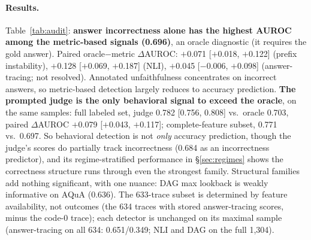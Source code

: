 \documentclass{article}
\begin{document}
\paragraph{Results.} Table~\ref{tab:audit}: \textbf{answer incorrectness alone has the highest AUROC among the metric-based signals (0.696)}, an oracle diagnostic (it requires the gold answer). Paired oracle$-$metric $\Delta$AUROC: $+$0.071 [$+$0.018, $+$0.122] (prefix instability), $+$0.128 [$+$0.069, $+$0.187] (NLI), $+$0.045 [$-$0.006, $+$0.098] (answer-tracing; not resolved). Annotated unfaithfulness concentrates on incorrect answers, so metric-based detection largely reduces to accuracy prediction. \textbf{The prompted judge is the only behavioral signal to exceed the oracle}, on the same samples: full labeled set, judge 0.782 [0.756, 0.808] vs.\ oracle 0.703, paired $\Delta$AUROC $+$0.079 [$+$0.043, $+$0.117]; complete-feature subset, 0.771 vs.\ 0.697. So behavioral detection is not \emph{only} accuracy prediction, though the judge's scores do partially track incorrectness (0.684 as an incorrectness predictor), and its regime-stratified performance in \S\ref{sec:regimes} shows the correctness structure runs through even the strongest family. Structural families add nothing significant, with one nuance: DAG max lookback is weakly informative on AQuA (0.636). The 633-trace subset is determined by feature availability, not outcomes (the 634 traces with stored answer-tracing scores, minus the code-0 trace); each detector is unchanged on its maximal sample (answer-tracing on all 634: 0.651/0.349; NLI and DAG on the full 1{,}304).
\end{document}
